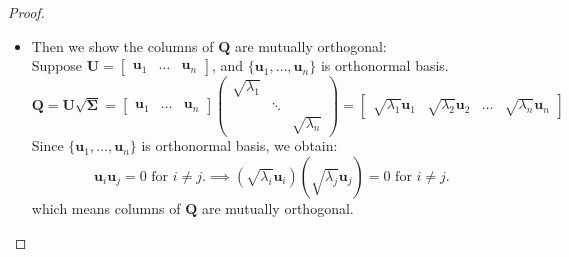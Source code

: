 \begin{enumerate}
\begin{proof}
\begin{itemize}
\item
Then we show the columns of $\bm Q$ are mutually orthogonal:\\
Suppose $\bm U=\begin{bmatrix}
\bm u_1&\dots&\bm u_n
\end{bmatrix}$, and $\{\bm u_1,\dots,\bm u_n\}$ is orthonormal basis.
\[
\bm Q=\bm U\sqrt{\bm\Sigma}
=\begin{bmatrix}
\bm u_1&\dots&\bm u_n
\end{bmatrix}\begin{pmatrix}
\sqrt{\lambda_1}&&\\&\ddots&\\&&\sqrt{\lambda_n}
\end{pmatrix}
=\begin{bmatrix}
\sqrt{\lambda_1}\bm u_1&\sqrt{\lambda_2}\bm u_2&\dots&\sqrt{\lambda_n}\bm u_n
\end{bmatrix}
\]
Since $\{\bm u_1,\dots,\bm u_n\}$ is orthonormal basis, we obtain:
\[
\bm u_i\bm u_j=0\text{ for }i\ne j.
\implies
(\sqrt{\lambda_i}\bm u_i)(\sqrt{\lambda_j}\bm u_j)=0\text{ for }i\ne j.
\]
which means columns of $\bm Q$ are mutually orthogonal.
\end{itemize}	
\end{proof}
\end{enumerate}